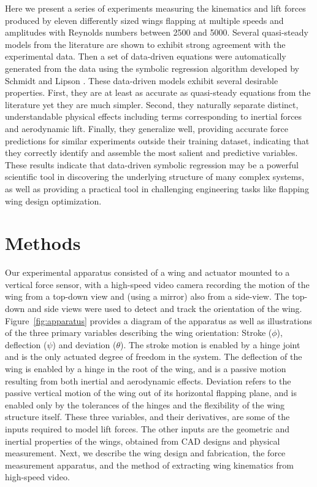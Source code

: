 \documentclass{article}
\begin{document}
Here we present a series of experiments measuring the kinematics and lift forces
produced by eleven differently sized wings flapping at multiple speeds and
amplitudes with Reynolds numbers between 2500 and 5000. Several quasi-steady
models from the literature are shown to exhibit strong agreement with the
experimental data. Then a set of data-driven equations were automatically
generated from the data using the symbolic regression algorithm developed by
Schmidt and Lipson \cite{schmidt2009distilling}. These data-driven models
exhibit several desirable properties. First, they are at least as accurate as
quasi-steady equations from the literature yet they are much simpler.  Second,
they naturally separate distinct, understandable physical effects including
terms corresponding to inertial forces and aerodynamic lift. Finally, they
generalize well, providing accurate force predictions for similar experiments
outside their training dataset, indicating that they correctly identify and
assemble the most salient and predictive variables. These results indicate that
data-driven symbolic regression may be a powerful scientific tool in discovering
the underlying structure of many complex systems, as well as providing a
practical tool in challenging engineering tasks like flapping wing design
optimization.

\section*{Methods}
Our experimental apparatus consisted of a wing and actuator mounted to a
vertical force sensor, with a high-speed video camera recording the motion of
the wing from a top-down view and (using a mirror) also from a side-view. The
top-down and side views were used to detect and track the orientation of the
wing.  Figure~\ref{fig:apparatus} provides a diagram of the apparatus as well as
illustrations of the three primary variables describing the wing orientation:
Stroke ($\phi$), deflection ($\psi$) and deviation ($\theta$). The stroke motion
is enabled by a hinge joint and is the only actuated degree of freedom in the
system. The deflection of the wing is enabled by a hinge in the root of the
wing, and is a passive motion resulting from both inertial and aerodynamic
effects. Deviation refers to the passive vertical motion of the wing out of its
horizontal flapping plane, and is enabled only by the tolerances of the hinges
and the flexibility of the wing structure itself. These three variables, and
their derivatives, are some of the inputs required to model lift forces. The
other inputs are the geometric and inertial properties of the wings, obtained
from CAD designs and physical measurement. Next, we describe the wing design and
fabrication, the force measurement apparatus, and the method of extracting wing
kinematics from high-speed video.
\end{document}
